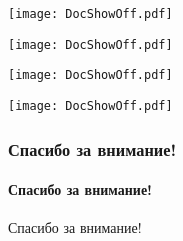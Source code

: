 \documentclass[c]{beamer}  %
\begin{document}
	\begin{frame}[plain]
		\hspace*{-0.1\textwidth}%
		\texttt{[image: DocShowOff.pdf]}
	\end{frame}

	\begin{frame}[plain]
		\hspace*{-0.1\textwidth}%
		\texttt{[image: DocShowOff.pdf]}
	\end{frame}

	\begin{frame}[plain]
		\hspace*{-0.1\textwidth}%
		\texttt{[image: DocShowOff.pdf]}
	\end{frame}

	\begin{frame}[plain]
		\hspace*{-0.1\textwidth}%
		\texttt{[image: DocShowOff.pdf]}
	\end{frame}


	\begin{frame}
		\frametitle{Спасибо за внимание!}
		\framesubtitle{Спасибо за внимание!}
		\centering \Huge Спасибо за внимание!		
	\end{frame}
\end{document}
